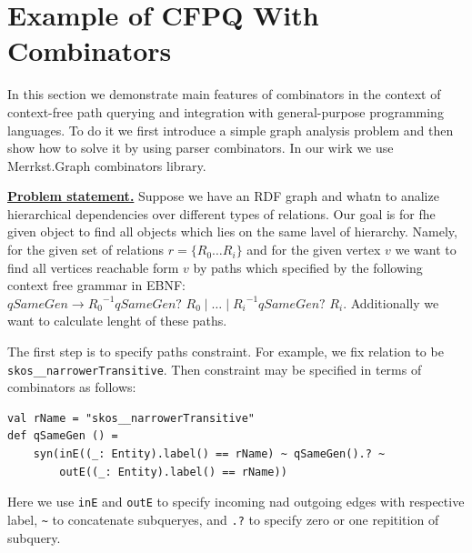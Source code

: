 \section{Example of CFPQ With Combinators}

In this section we demonstrate main features of combinators in the context of context-free path querying and integration with general-purpose programming languages.
To do it we first introduce a simple graph analysis problem and then show how to solve it by using parser combinators.
In our wirk we use Merrkst.Graph combinators library.

\underline{\textbf{Problem statement.}}
Suppose we have an RDF graph and whatn to analize hierarchical dependencies over different types of relations.
Our goal is for fhe given object to find all objects which lies on the same lavel of hierarchy.
Namely, for the given set of relations $r = \{R_0 \ldots R_i\}$ and for the given vertex $v$ we want to find all vertices reachable form $v$ by paths which specified by the following context free grammar in EBNF: 
 $\textit{qSameGen} \to {R_0}^{-1} \textit{qSameGen? } R_0 \mid \ldots \mid {R_i}^{-1} \textit{qSameGen? } R_i.$
Additionally we want to calculate lenght of these paths.


The first step is to specify paths constraint. 
For example, we fix relation to be \verb|skos__narrowerTransitive|.
Then constraint may be specified in terms of combinators as follows:

\begin{lstlisting}
val rName = "skos__narrowerTransitive"
def qSameGen () =
    syn(inE((_: Entity).label() == rName) ~ qSameGen().? ~
        outE((_: Entity).label() == rName))
\end{lstlisting}

Here we use \verb|inE| and \verb|outE| to specify incoming nad outgoing edges with respective label, \verb|~| to concatenate subqueryes, and \verb|.?| to specify zero or one repitition of subquery.


